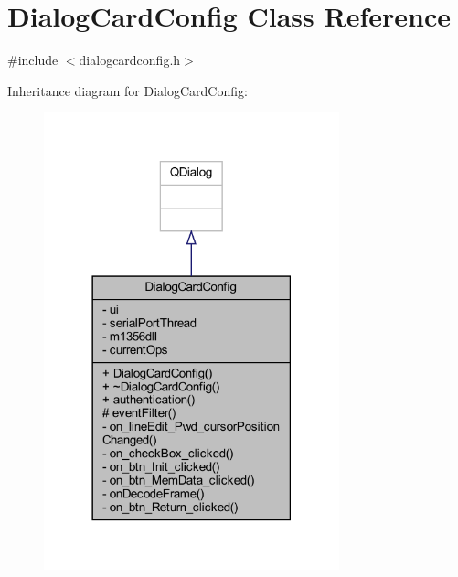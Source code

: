 \hypertarget{class_dialog_card_config}{}\section{Dialog\+Card\+Config Class Reference}
\label{class_dialog_card_config}


{\ttfamily \#include $<$dialogcardconfig.\+h$>$}



Inheritance diagram for Dialog\+Card\+Config\+:
\nopagebreak
\begin{figure}[H]
\begin{center}
\leavevmode
\includegraphics[width=242pt]{class_dialog_card_config__inherit__graph}
\end{center}
\end{figure}


